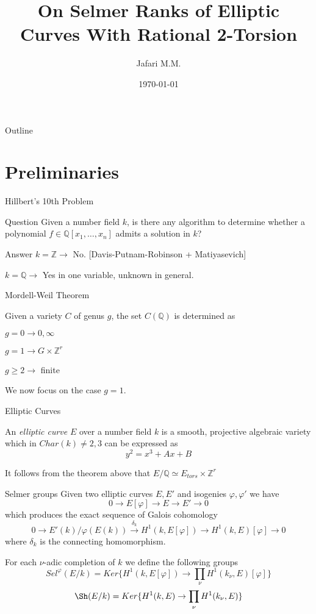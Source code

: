 \documentclass[presentation]{beamer}
\author{Jafari M.M.}
\date{\today}
\title{On Selmer Ranks of Elliptic Curves With Rational 2-Torsion}
\begin{document}
\maketitle
\begin{frame}{Outline}
\tableofcontents
\end{frame}

\section{Preliminaries}
\label{sec:orgc854796}

\begin{frame}[label={sec:orgc05925c}]{Hillbert's 10th Problem}
\begin{block}{Question}
Given a number field \(k\), is there any algorithm to determine whether a
polynomial \(f \in \mathbb{Q}[x_1,\dots,x_n]\) admits a solution in \(k\)?
\end{block}

\begin{block}{Answer}
\(k = \mathbb{Z} \to\) No. [Davis-Putnam-Robinson + Matiyasevich]

\(k = \mathbb{Q} \to\) Yes in one variable, unknown in general.
\end{block}
\end{frame}
\begin{frame}[label={sec:org9e155ca}]{Mordell-Weil Theorem}
\begin{theorem}
Given a variety \(C\) of genus \(g\), the set \(C(\mathbb{Q})\) is determined as

\(g = 0 \to 0, \infty\)

\(g = 1 \to G \times \mathbb{Z}^r\)

\(g \ge 2 \to\) finite
\end{theorem}

We now focus on the case \(g = 1\).
\end{frame}
\begin{frame}[label={sec:orgb900c89}]{Elliptic Curves}
\begin{definition}
An \emph{elliptic curve} \(E\) over a number field \(k\) is a smooth, projective
algebraic variety which in \(Char(k) \ne 2,3\) can be expressed as
$$y^2 = x^3 + Ax + B$$
\end{definition}

It follows from the theorem above that
\(E/\mathbb{Q} \simeq E_{tors} \times \mathbb{Z}^r\)
\end{frame}
\begin{frame}[label={sec:org239ecfc}]{Selmer groups}
Given two elliptic curves \(E,E'\) and isogenies \(\varphi,\varphi'\) we have
$$0 \longrightarrow E[\varphi] \longrightarrow E \longrightarrow E'
\longrightarrow 0$$
which produces the exact sequence of Galois cohomology
$$0 \longrightarrow E'(k)/\varphi(E(k))
\overset{\delta_k}{\longrightarrow} H^1(k,E[\varphi]) \longrightarrow
H^1(k,E)[\varphi] \longrightarrow 0$$
where \(\delta_k\) is the connecting homomorphism.

For each \(\nu\)-adic completion of \(k\) we define the following groups
$$Sel^\varphi(E/k) = Ker\{H^1(k,E[\varphi]) \to \prod_\nu H^1(k_\nu, E)[\varphi]\}$$
$$\Sh(E/k) = Ker\{H^1(k,E) \to \prod_\nu H^1(k_\nu, E)\}$$
\end{frame}
\end{document}
